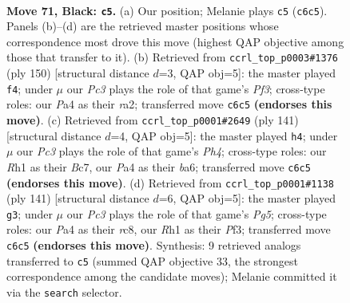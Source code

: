 \documentclass[11pt]{article}
\begin{document}
\clearpage

\begin{figure}[p]\centering
\begin{subfigure}{0.46\textwidth}\centering
\resizebox{\linewidth}{!}{%
\newchessgame
\chessboard[
  setfen={8/8/2pk4/3p4/p7/8/1K6/7r b - - 5 71},
  showmover=false,
  pgfstyle=straightmove, color=movearrow, markmove={c6-c5}
]}
\caption{}
\end{subfigure}\hfill
\begin{subfigure}{0.46\textwidth}\centering
\resizebox{\linewidth}{!}{%
\newchessgame
\chessboard[
  setfen={8/8/6k1/3R4/6P1/5PK1/r7/8 w - - 3 76},
  showmover=false,
  pgfstyle=straightmove, color=movearrow, markmove={f3-f4}
]}
\caption{}
\end{subfigure}
\\[4pt]
\begin{subfigure}{0.46\textwidth}\centering
\resizebox{\linewidth}{!}{%
\newchessgame
\chessboard[
  setfen={8/2b5/B7/6kp/6p1/8/6K1/8 b - - 5 71},
  showmover=false,
  pgfstyle=straightmove, color=movearrow, markmove={h5-h4}
]}
\caption{}
\end{subfigure}\hfill
\begin{subfigure}{0.46\textwidth}\centering
\resizebox{\linewidth}{!}{%
\newchessgame
\chessboard[
  setfen={2R5/8/8/8/6pk/5p1p/8/6K1 b - - 19 71},
  showmover=false,
  pgfstyle=straightmove, color=movearrow, markmove={g4-g3}
]}
\caption{}
\end{subfigure}
\caption{\textbf{Move 71, Black: \texttt{c5}.} (a) Our position; Melanie plays \texttt{c5} (\texttt{c6c5}). Panels (b)--(d) are the retrieved master positions whose correspondence most drove this move (highest QAP objective among those that transfer to it). (b) Retrieved from \texttt{ccrl\_top\_p0003\#1376} (ply 150) [structural distance $d$=3, QAP obj=5]: the master played \texttt{f4}; under $\mu$ our \emph{Pc3} plays the role of that game's \emph{Pf3}; cross-type roles: our \emph{P}a4 as their \emph{r}a2; transferred move \texttt{c6c5} \textbf{(endorses this move)}. (c) Retrieved from \texttt{ccrl\_top\_p0001\#2649} (ply 141) [structural distance $d$=4, QAP obj=5]: the master played \texttt{h4}; under $\mu$ our \emph{Pc3} plays the role of that game's \emph{Ph4}; cross-type roles: our \emph{R}h1 as their \emph{B}c7, our \emph{P}a4 as their \emph{b}a6; transferred move \texttt{c6c5} \textbf{(endorses this move)}. (d) Retrieved from \texttt{ccrl\_top\_p0001\#1138} (ply 141) [structural distance $d$=6, QAP obj=5]: the master played \texttt{g3}; under $\mu$ our \emph{Pc3} plays the role of that game's \emph{Pg5}; cross-type roles: our \emph{P}a4 as their \emph{r}c8, our \emph{R}h1 as their \emph{P}f3; transferred move \texttt{c6c5} \textbf{(endorses this move)}. Synthesis: 9 retrieved analogs transferred to \texttt{c5} (summed QAP objective 33, the strongest correspondence among the candidate moves); Melanie committed it via the \texttt{search} selector.}
\label{fig:thought-m141}
\end{figure}
\end{document}
